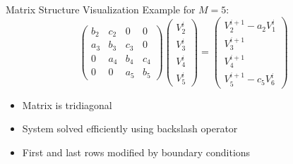 \documentclass{beamer}
\begin{document}
\begin{frame}{Matrix Structure Visualization}
    Example for $M=5$:
    \[
    \begin{pmatrix}
        b_2 & c_2 & 0 & 0 \\
        a_3 & b_3 & c_3 & 0 \\
        0 & a_4 & b_4 & c_4 \\
        0 & 0 & a_5 & b_5
    \end{pmatrix}
    \begin{pmatrix}
        V_2^i \\
        V_3^i \\
        V_4^i \\
        V_5^i
    \end{pmatrix}
    =
    \begin{pmatrix}
        V_2^{i+1} - a_2V_1^i \\
        V_3^{i+1} \\
        V_4^{i+1} \\
        V_5^{i+1} - c_5V_6^i
    \end{pmatrix}
    \]
    
    \begin{itemize}
        \item Matrix is tridiagonal
        \item System solved efficiently using backslash operator
        \item First and last rows modified by boundary conditions
    \end{itemize}
\end{frame}
\end{document}
